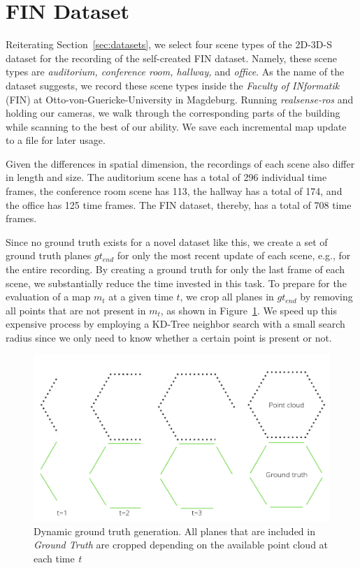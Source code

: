 \documentclass[main.tex]{subfiles}
\begin{document}
\section{FIN Dataset}
\label{sec:finimpl}
Reiterating Section~\ref{sec:datasets}, we select four scene types of the 2D-3D-S dataset for the recording of the self-created FIN
dataset. Namely, these scene types are \textit{auditorium, conference room, hallway,} and \textit{office}.
As the name of the dataset suggests, we record these scene types inside the \textit{Faculty of INformatik} (FIN) at Otto-von-Guericke-University 
in Magdeburg.
Running \textit{realsense-ros} and holding our cameras, we walk through the corresponding parts of the building while scanning to the best of our ability.
We save each incremental map update to a file for later usage.

Given the differences in spatial dimension, the recordings of each scene also differ in length and size.
The auditorium scene has a total of 296 individual time frames, the conference room scene has 113, the hallway has a total of 
174, and the office has 125 time frames.
The FIN dataset, thereby, has a total of 708 time frames.

Since no ground truth exists for a novel dataset like this, we create a set of ground truth planes $gt_{end}$ for only the most recent update of each scene, e.g., for the entire recording.
By creating a ground truth for only the last frame of each scene, we substantially reduce the time invested in this task. 
To prepare for the evaluation of a map $m_t$ at a given time $t$, we crop all planes in $gt_{end}$ by removing all points that are not present in $m_t$, as shown in
Figure~\ref{fig:dynGT}.
We speed up this expensive process by employing a KD-Tree neighbor search with a small search radius since we only need to know whether a certain point is present or not.
\begin{figure}[H]
    \centering
    \includegraphics[width=15 cm]{images/dynamic_eval.png}
    \caption[Dynamic Ground Truth Generation]{Dynamic ground truth generation. All planes that are included in \textit{Ground Truth} are cropped depending on
        the available point cloud at each time \textit{t} }
    \label{fig:dynGT}
\end{figure}
\end{document}
